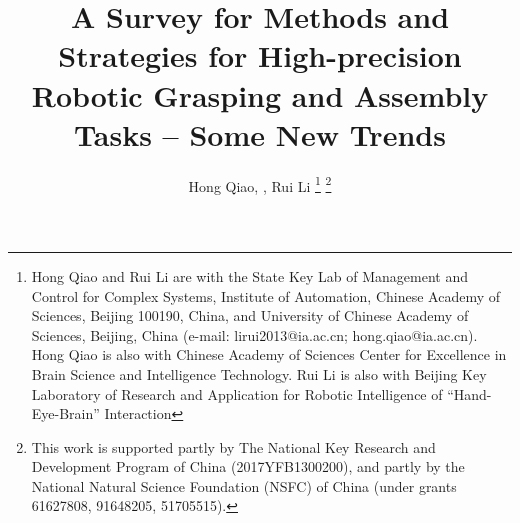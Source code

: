 \documentclass[journal,twoside,web]{ieeecolor}
\begin{document}
\title{A Survey for Methods and Strategies for High-precision Robotic Grasping and Assembly Tasks -- Some New Trends}
\author{Hong Qiao, , Rui Li
\thanks{Hong Qiao and Rui Li are with the State Key Lab of Management and Control for Complex Systems, Institute of Automation, Chinese Academy of Sciences, Beijing 100190, China, and University of Chinese Academy of Sciences, Beijing, China (e-mail: lirui2013@ia.ac.cn; hong.qiao@ia.ac.cn). Hong Qiao is also with Chinese Academy of Sciences Center for Excellence in Brain Science and Intelligence Technology. Rui Li is also with Beijing Key Laboratory of Research and Application for Robotic Intelligence of “Hand-Eye-Brain” Interaction}
\thanks{This work is supported partly by The National Key Research and Development Program of China (2017YFB1300200), and partly by the National Natural Science Foundation (NSFC) of China (under grants 61627808, 91648205, 51705515).}}

\maketitle
\end{document}
